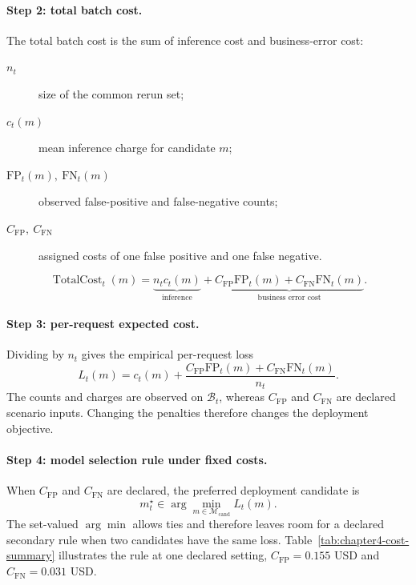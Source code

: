 \paragraph{Step 2: total batch cost.}
The total batch cost is the sum of inference cost and business-error cost:
\begin{description}
    \item[\(n_t\)] size of the common rerun set;
    \item[\(c_t(m)\)] mean inference charge for candidate \(m\);
    \item[\(\mathrm{FP}_t(m),\ \mathrm{FN}_t(m)\)] observed false-positive and false-negative counts;
    \item[\(C_{\mathrm{FP}},\ C_{\mathrm{FN}}\)] assigned costs of one false positive and one false negative.
\end{description}
\begin{equation}
    \operatorname{TotalCost}_t(m)
    =
    \underbrace{n_t c_t(m)}_{\text{inference}}
    +
    \underbrace{
        C_{\mathrm{FP}}\mathrm{FP}_t(m)
        +C_{\mathrm{FN}}\mathrm{FN}_t(m)
    }_{\text{business error cost}}.
    \label{eq:total-batch-cost}
\end{equation}

\paragraph{Step 3: per-request expected cost.}
Dividing by \(n_t\) gives the empirical per-request loss
\begin{equation}
L_t(m)
=
c_t(m)
+
\frac{
    C_{\mathrm{FP}}\mathrm{FP}_t(m)
    +C_{\mathrm{FN}}\mathrm{FN}_t(m)
}{n_t}.
\label{eq:expected-cost}
\end{equation}
The counts and charges are observed on \(\mathcal{B}_t\), whereas \(C_{\mathrm{FP}}\) and \(C_{\mathrm{FN}}\) are declared scenario inputs. Changing the penalties therefore changes the deployment objective.

\paragraph{Step 4: model selection rule under fixed costs.}
When \(C_{\mathrm{FP}}\) and \(C_{\mathrm{FN}}\) are declared, the preferred deployment candidate is
\begin{equation}
    m_t^\star
    \in
    \arg\min_{m\in\mathcal{M}_{\mathrm{cand}}}
    L_t(m).
    \label{eq:model-selection}
\end{equation}
The set-valued \(\arg\min\) allows ties and therefore leaves room for a declared secondary rule when two candidates have the same loss. Table~\ref{tab:chapter4-cost-summary} illustrates the rule at one declared setting, \(C_{\mathrm{FP}}=0.155\) USD and \(C_{\mathrm{FN}}=0.031\) USD.


